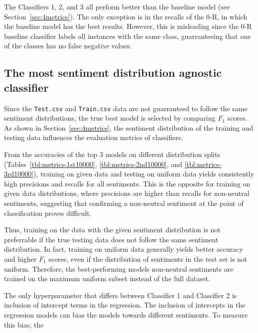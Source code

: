 \documentclass[11pt]{article}
\begin{document}
The Classifiers 1, 2, and 3 all perform better than the baseline model (see Section~\ref{sec:4metrics}). 
The only exception is in the recalls of the 0-R, in which the baseline model has the best results.
However, this is misleading since the 0-R baseline classifier labels all instances with the same class, 
guarranteeing that one of the classes has no false negative values.


\subsection{The most sentiment distribution agnostic classifier}\label{sec:agnostic}

Since the \texttt{Test.csv} and \texttt{Train.csv} data are not guarranteed to follow the same sentiment distributions,
the true best model is selected by comparing $F_1$ scores.
As shown in Section~\ref{sec:4metrics}, the sentiment distribution of the training and testing data influences the evaluation metrics of classifiers.


From the accuracies of the top 3 models on different distribution splits (Tables~\ref{tbl:metrics-1st10000}, \ref{tbl:metrics-2nd10000}, and \ref{tbl:metrics-3rd10000}), 
training on given data and testing on uniform data yields consistently high precisions and recalls for all sentiments.
This is the opposite for training on given data distributions, where precisions are higher than recalls for non-neutral sentiments, 
suggesting that confirming a non-neutral sentiment at the point of classification proves difficult.


Thus, training on the data with the given sentiment distribution is not preferrable if the true testing data does not follow the same sentiment distribution.
In fact, training on uniform data generally yields better accuracy and higher $F_1$ scores, 
even if the distribution of sentiments in the test set is not uniform.
Therefore, the best-performing models non-neutral sentiments are trained on the maximum uniform subset instead of the full dataset.


The only hyperparameter that differs between Classifier 1 and Classifier 2 is inclusion of intercept terms in the regression.
The inclusion of intercepts in the regression models can bias the models towards different sentiments.
To measure this bias, the 
\end{document}

